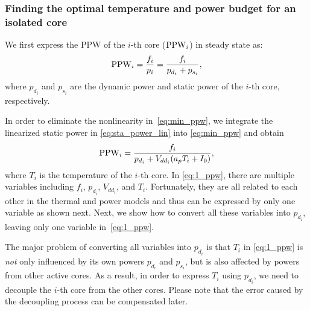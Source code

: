 

\subsubsection{Finding the optimal temperature and power budget for an
  isolated core}\label{sec:opt_temp_iso}

We first express the PPW of the $i$-th core ($\operatorname{PPW}_i$) in steady state as:
\begin{equation}\label{eq:min_ppw}
\ppw_i=\frac{f_i}{p_i}=\frac{f_i}{p_{d_i}+p_{s_i}},
\end{equation}
where $p_{d_i}$ and $p_{s_i}$ are the dynamic power and static power
of the $i$-th core, respectively. 

In order to eliminate the nonlinearity in~\eqref{eq:min_ppw}, we
integrate the linearized static power in \eqref{eq:sta_power_lin} into
\eqref{eq:min_ppw} and obtain
\begin{equation}\label{eq:1_ppw}
\ppw_i = \frac{f_i}{p_{d_i}+V_{dd_i}(a_pT_i+I_{0})},
\end{equation}
where $T_i$ is the temperature of the $i$-th core. In \eqref{eq:1_ppw}, there are multiple variables
including $f_i$, $p_{d_i}$, $V_{dd_i}$, and $T_i$. Fortunately, they are all
related to each other in the thermal and power models and thus can be expressed by only one
variable as shown next. Next, we show how to convert all these variables into
$p_{d_i}$, leaving only one variable in~\eqref{eq:1_ppw}.

The major problem of converting all variables into $p_{d_i}$ is that
$T_{i}$ in \eqref{eq:1_ppw} is \emph{not} only influenced by its own
powers $p_{d_i}$ and $p_{s_i}$, but is also affected by powers from
other active cores. As a result, in order to express $T_{i}$ using $p_{d_i}$, we need to
decouple the $i$-th core from the other cores. Please note that the error caused by the
decoupling process can be compensated later. 

